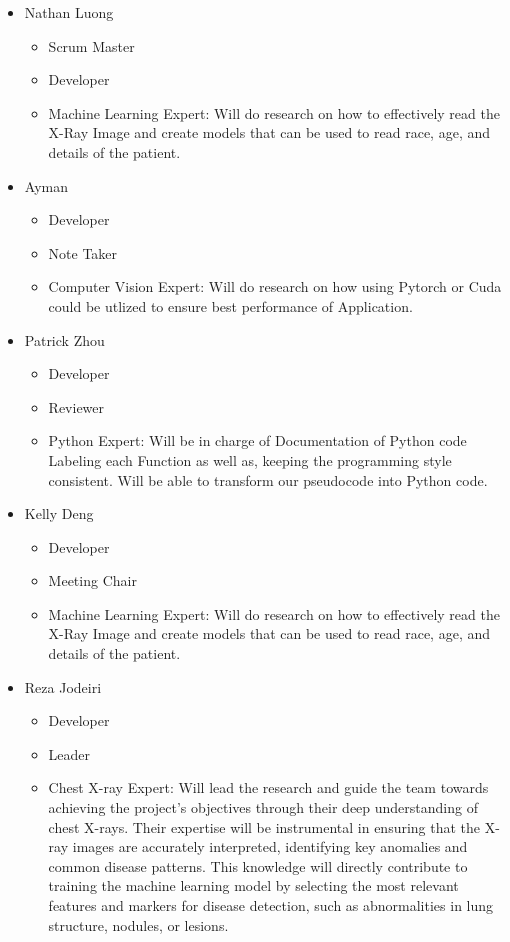 \documentclass{article}
\begin{document}
\begin{itemize}
\item Nathan Luong
    \begin{itemize}
        \item Scrum Master
        \item Developer
        \item Machine Learning Expert: Will do research on how to effectively read the X-Ray Image and create models that can be used to read race, age, and details of the patient. 
    \end{itemize}
    \item Ayman
    \begin{itemize}
        \item Developer
        \item Note Taker
        \item Computer Vision Expert: Will do research on how using Pytorch or Cuda could be utlized to ensure best performance of Application. 
    \end{itemize}
\item Patrick Zhou
    \begin{itemize}
        \item Developer
        \item Reviewer
        \item Python Expert: Will be in charge of Documentation of Python code Labeling each Function as well as, keeping the programming style consistent. Will be able to transform our pseudocode  into Python code. 
    \end{itemize}
        
\item Kelly Deng
    \begin{itemize}
        \item Developer
        \item Meeting Chair
        \item Machine Learning Expert: Will do research on how to effectively read the X-Ray Image and create models that can be used to read race, age, and details of the patient. 
    \end{itemize}
\item Reza Jodeiri
    \begin{itemize}
        \item Developer
        \item Leader 
        \item Chest X-ray Expert: Will lead the research and guide the team towards achieving the project’s objectives through their deep understanding of chest X-rays. Their expertise will be instrumental in ensuring that the X-ray images are accurately interpreted, identifying key anomalies and common disease patterns. This knowledge will directly contribute to training the machine learning model by selecting the most relevant features and markers for disease detection, such as abnormalities in lung structure, nodules, or lesions. 
    \end{itemize}
\end{itemize}
  
\end{document}
